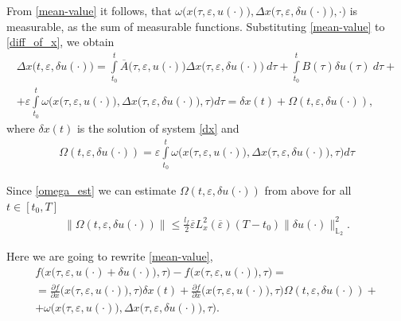 \documentclass[../main.tex]{subfiles}
\begin{document}
From \eqref{mean-value} it follows, that $\omega\Big(x\big(\tau,\varepsilon, u(\cdot)\big),\Delta x\big(\tau, \varepsilon, \delta u(\cdot)\big),\cdot\big)$ is measurable, as the sum of measurable functions.
Substituting \eqref{mean-value} to \eqref{diff_of_x}, we obtain
\begin{gather*}
	\Delta x\big(t, \varepsilon, \delta u(\cdot)\big)
	= \int\limits_{t_0}^t 
	\overline{A}\big(\tau,\varepsilon,u(\cdot)\big) 
	\Delta x\big(\tau, \varepsilon, \delta u(\cdot)\big)\ d\tau + 
	\int\limits_{t_0}^t B(\tau) \delta u(\tau)\ d\tau + \\ +
	\varepsilon\int\limits_{t_0}^t \omega\Big(x\big(\tau,\varepsilon, u(\cdot)\big),\Delta x\big(\tau, \varepsilon, \delta u(\cdot)\big),\tau\Big) d\tau = 
	\delta x(t) + \Omega(t,\varepsilon, \delta u(\cdot)),
\end{gather*}
where $\delta x(t)$ is the solution of system \eqref{dx} and
\begin{gather*}
	\Omega(t,\varepsilon, \delta u(\cdot)) = \varepsilon\int\limits_{t_0}^t 
	\omega\Big(x\big(\tau,\varepsilon, u(\cdot)\big),\Delta x\big(\tau, \varepsilon, \delta u(\cdot)\big),\tau\Big) d\tau
\end{gather*}


Since \eqref{omega_est} we can estimate $\Omega(t,\varepsilon, \delta u(\cdot)) $ from above for all $t \in [t_0, T]$
\begin{gather}
	\| \Omega(t,\varepsilon, \delta u(\cdot))\| \leqslant \frac{l_f}{2} \overline{\varepsilon} L_x^2(\overline{\varepsilon})(T-t_0)\|\delta u(\cdot)\|_{\mathbb{L}_2}^2.
\end{gather}

Here we are going to rewrite \eqref{mean-value},  
\begin{gather*}
	f\Big(x\big(\tau,\varepsilon, u(\cdot) + \delta u(\cdot)\big),\tau\Big) -
	f\Big(x\big(\tau,\varepsilon, u(\cdot)\big),\tau\Big) = \\ =
	\frac{\partial f}{\partial x}  \Big(x\big(\tau,\varepsilon, u(\cdot)\big), \tau\Big) \delta x(t) + 
	\frac{\partial f}{\partial x} \Big(x\big(\tau,\varepsilon, u(\cdot)\big), \tau\Big) \Omega(t,\varepsilon, \delta u(\cdot))
	+ \\ + 
	\omega\Big(x\big(\tau,\varepsilon, u(\cdot)\big),\Delta x\big(\tau, \varepsilon, \delta u(\cdot)\big),\tau\Big).
\end{gather*}
\end{document}
